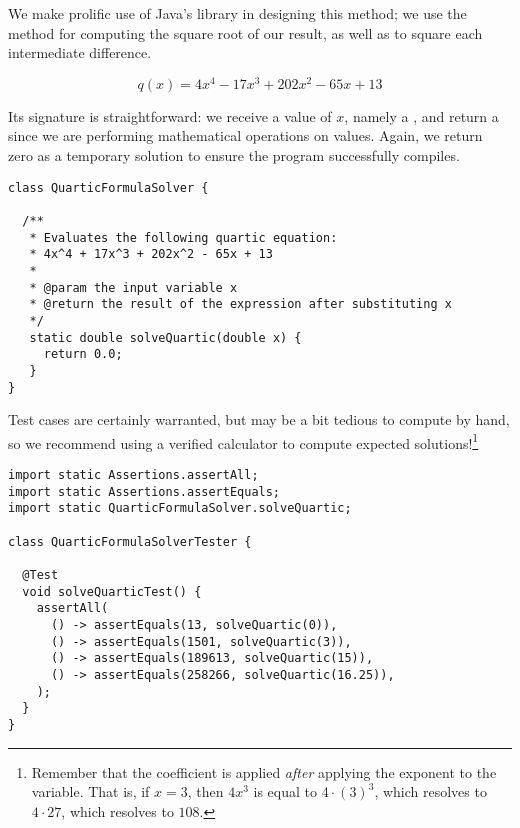 We make prolific use of Java's  library in designing this method; we use the  method for computing the square root of our result, as well as  to square each intermediate difference.


\[
q(x) = 4x^4 - 17x^3 + 202x^2 - 65x + 13
\]

Its signature is straightforward: we receive a value of $x$, namely a , and return a  since we are performing mathematical operations on  values. Again, we return zero as a temporary solution to ensure the program successfully compiles.
 
\begin{cl}{}
\begin{lstlisting}[language=MyJava]
class QuarticFormulaSolver {

  /**
   * Evaluates the following quartic equation:
   * 4x^4 + 17x^3 + 202x^2 - 65x + 13
   *
   * @param the input variable x
   * @return the result of the expression after substituting x
   */
   static double solveQuartic(double x) {
     return 0.0;
   }
}
\end{lstlisting}
\end{cl}

Test cases are certainly warranted, but may be a bit tedious to compute by hand, so we recommend using a verified calculator to compute expected solutions!\footnote{Remember that the coefficient is applied \textit{after} applying the exponent to the variable. That is, if $x=3$, then $4x^3$ is equal to $4 \cdot (3)^3$, which resolves to $4 \cdot 27$, which resolves to $108$.}

\begin{cl}{}
\begin{lstlisting}[language=MyJava]
import static Assertions.assertAll;
import static Assertions.assertEquals;
import static QuarticFormulaSolver.solveQuartic;

class QuarticFormulaSolverTester {

  @Test
  void solveQuarticTest() {
    assertAll(
      () -> assertEquals(13, solveQuartic(0)),
      () -> assertEquals(1501, solveQuartic(3)),
      () -> assertEquals(189613, solveQuartic(15)),
      () -> assertEquals(258266, solveQuartic(16.25)),
    );
  }
}
\end{lstlisting}
\end{cl}

